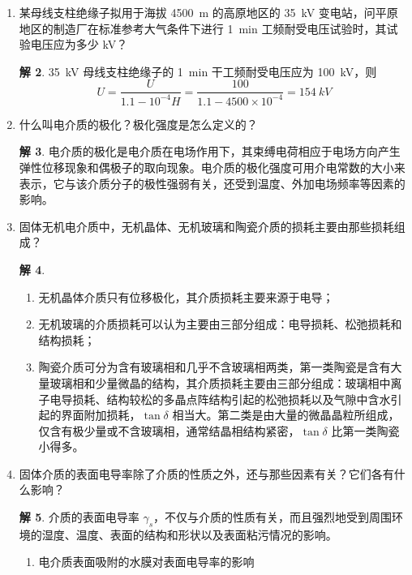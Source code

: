 \documentclass[zihao=-4,fontset = none]{ctexart}
\theoremstyle{definition}
\newtheorem*{solution}{解}
\begin{document}
\begin{enumerate}
\begin{solution}
    冲击击穿电压 $U_{50\text{ 夏}} = U \cdot K_1 \cdot K_2 = 1300 \times 0.9827 \times 1.033 = \SI{1320}{kV}$。
  \end{solution}
  \item 某母线支柱绝缘子拟用于海拔 \SI{4500}{m} 的高原地区的 \SI{35}{kV} 变电站，问平原地区的制造厂在标准参考大气条件下进行 \SI{1}{min} 工频耐受电压试验时，其试验电压应为多少 \si{kV}？
  \begin{solution}
    \SI{35}{kV} 母线支柱绝缘子的 \SI{1}{min} 干工频耐受电压应为 \SI{100}{kV}，则
    \[ U = \frac{U}{1.1 - 10^{-4}H} = \frac{100}{1.1 - 4500 \times 10^{-4}} = \SI{154}{kV} \]
  \end{solution}
  \item 什么叫电介质的极化？极化强度是怎么定义的？
  \begin{solution}
    电介质的极化是电介质在电场作用下，其束缚电荷相应于电场方向产生弹性位移现象和偶极子的取向现象。电介质的极化强度可用介电常数的大小来表示，它与该介质分子的极性强弱有关，还受到温度、外加电场频率等因素的影响。
  \end{solution}
  \item 固体无机电介质中，无机晶体、无机玻璃和陶瓷介质的损耗主要由那些损耗组成？
  \begin{solution}
    \begin{enumerate}
      \item 无机晶体介质只有位移极化，其介质损耗主要来源于电导；
      \item 无机玻璃的介质损耗可以认为主要由三部分组成：电导损耗、松弛损耗和结构损耗；
      \item 陶瓷介质可分为含有玻璃相和几乎不含玻璃相两类，第一类陶瓷是含有大量玻璃相和少量微晶的结构，其介质损耗主要由三部分组成：玻璃相中离子电导损耗、结构较松的多晶点阵结构引起的松弛损耗以及气隙中含水引起的界面附加损耗，$\tan \delta$ 相当大。第二类是由大量的微晶晶粒所组成，仅含有极少量或不含玻璃相，通常结晶相结构紧密，$\tan \delta$ 比第一类陶瓷小得多。
    \end{enumerate}
  \end{solution}
  \item 固体介质的表面电导率除了介质的性质之外，还与那些因素有关？它们各有什么影响？
  \begin{solution}
    介质的表面电导率 $\gamma_s$，不仅与介质的性质有关，而且强烈地受到周围环境的湿度、温度、表面的结构和形状以及表面粘污情况的影响。
    \begin{enumerate}
      \item 电介质表面吸附的水膜对表面电导率的影响
      

\end{enumerate}
\end{solution}
\end{enumerate}
\end{document}
